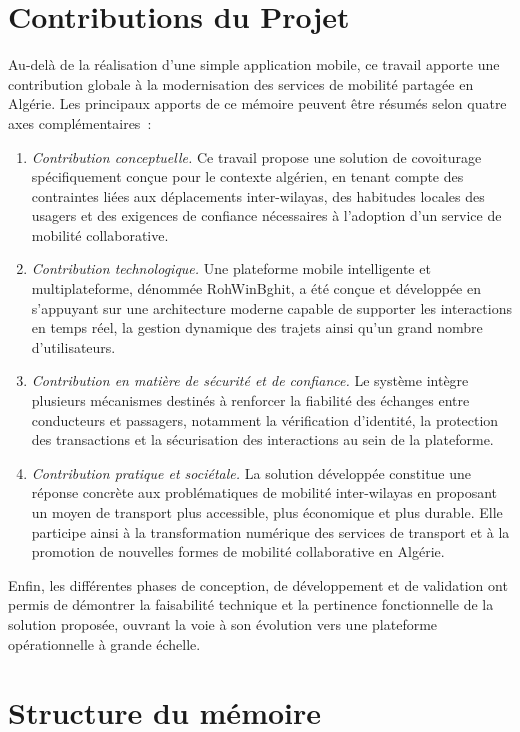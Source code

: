 \section*{Contributions du Projet}

Au-delà de la réalisation d'une simple application mobile, ce travail apporte une contribution globale à la modernisation des services de mobilité partagée en Algérie. Les principaux apports de ce mémoire peuvent être résumés selon quatre axes complémentaires~:
\begin{enumerate}
  \item \textit{Contribution conceptuelle.} Ce travail propose une solution de covoiturage spécifiquement conçue pour le contexte algérien, en tenant compte des contraintes liées aux déplacements inter-wilayas, des habitudes locales des usagers et des exigences de confiance nécessaires à l’adoption d’un service de mobilité collaborative.
  \item \textit{Contribution technologique.} Une plateforme mobile intelligente et multiplateforme, dénommée RohWinBghit, a été conçue et développée en s’appuyant sur une architecture moderne capable de supporter les interactions en temps réel, la gestion dynamique des trajets ainsi qu’un grand nombre d’utilisateurs.
  \item \textit{Contribution en matière de sécurité et de confiance.} Le système intègre plusieurs mécanismes destinés à renforcer la fiabilité des échanges entre conducteurs et passagers, notamment la vérification d’identité, la protection des transactions et la sécurisation des interactions au sein de la plateforme.
  \item \textit{Contribution pratique et sociétale.} La solution développée constitue une réponse concrète aux problématiques de mobilité inter-wilayas en proposant un moyen de transport plus accessible, plus économique et plus durable. Elle participe ainsi à la transformation numérique des services de transport et à la promotion de nouvelles formes de mobilité collaborative en Algérie.
\end{enumerate}

Enfin, les différentes phases de conception, de développement et de validation ont permis de démontrer la faisabilité technique et la pertinence fonctionnelle de la solution proposée, ouvrant la voie à son évolution vers une plateforme opérationnelle à grande échelle.

\section*{Structure du mémoire}

